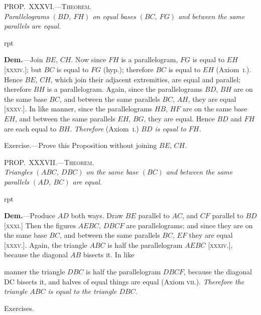 \documentclass[oneside]{book}
\newcounter{wrapwidth}
\newcommand\myprop[2]{
\bigskip\Needspace*{4\baselineskip}\begin{center}\textsc{#1}\\\medskip\emph{#2}\par\end{center}
}
\newcommand\exhead[1]{
\Needspace*{5\baselineskip}\begin{center}
\textsf{#1}
\end{center}
}
\newcommand\imgflow[3]{
\setcounter{wrapwidth}{#1}

\begin{wrapfigure}[#2]{r}{\value{wrapwidth}pt}
\begin{center}
\vspace{-0.3in}

\end{center}
\end{wrapfigure}
}
\begin{document}
\myprop{PROP\@.~XXXVI\@.---Theorem.}{Parallelograms $(BD,\ FH)$ on equal bases $(BC,\ FG)$ and
between the same parallels are equal.}


\imgflow{190}{8}{f057}

\textbf{Dem.}---Join $BE$, $CH$. Now since $FH$ is a parallelogram,
$FG$ is equal
to $EH$ [\textsc{xxxiv}.]; but
$BC$ is equal to $FG$
(hyp.); therefore
$BC$ is equal to $EH$
(Axiom~\textsc{i}.). Hence
$BE$, $CH$, which join
their adjacent extremities,
are equal and parallel; therefore $BH$ is a
parallelogram. Again, since the parallelograms $BD$,
$BH$ are on the same base $BC$, and between the same
parallels $BC$, $AH$, they are equal [\textsc{xxxv}.]. In like
manner, since the parallelograms $HB$, $HF$ are on the
same base $EH$, and between the same parallels $EH$,
$BG$, they are equal. Hence $BD$ and $FH$ are each equal
to $BH$. \emph{Therefore} (Axiom~\textsc{i}.) \emph{$BD$ is equal to $FH$.}

\begin{footnotesize}
\textsf{Exercise}.---Prove this Proposition without joining $BE$, $CH$.
\par\end{footnotesize}



\myprop{PROP\@.~XXXVII\@.---Theorem.}{Triangles $(ABC,\ DBC)$ on the same base $(BC)$ and between
the same parallels $(AD,\ BC)$ are equal.}


\imgflow{190}{8}{f058}

\textbf{Dem.}---Produce $AD$ both ways. Draw $BE$ parallel
to $AC$, and $CF$ parallel
to $BD$ [\textsc{xxxi}.]
Then the figures
$AEBC$, $DBCF$ are
parallelograms; and
since they are on
the same base $BC$,
and between the
same parallels $BC$, $EF$ they are equal [\textsc{xxxv}.]. Again,
the triangle $ABC$ is half the parallelogram $AEBC$
[\textsc{xxxiv}.], because the diagonal $AB$ bisects it. In like

manner the triangle $DBC$ is half the parallelogram
$DBCF$, because the diagonal DC bisects it, and halves
of equal things are equal (Axiom \textsc{vii}.). \emph{Therefore the
triangle $ABC$ is equal to the triangle $DBC$.}

\exhead{Exercises.}
\end{document}
